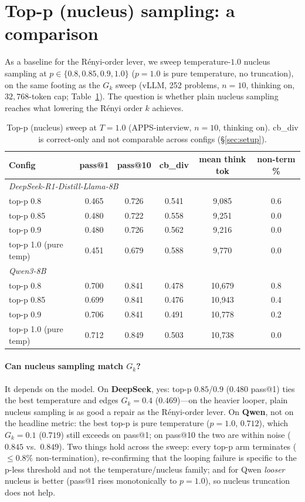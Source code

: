 \documentclass[11pt]{article}                       %
\begin{document}
\section{Top-p (nucleus) sampling: a comparison}\label{app:topp}
As a baseline for the R\'enyi-order lever, we sweep temperature-$1.0$ nucleus sampling at
$p\in\{0.8,0.85,0.9,1.0\}$ ($p{=}1.0$ is pure temperature, no truncation), on the same footing as the
$G_k$ sweep (vLLM, 252 problems, $n{=}10$, thinking on, $32{,}768$-token cap; Table~\ref{tab:topp}). The
question is whether plain nucleus sampling reaches what lowering the R\'enyi order $k$ achieves.

\begin{table}[H]\centering\small
\caption{Top-p (nucleus) sweep at $T{=}1.0$ (APPS-interview, $n{=}10$, thinking on). cb\_div is
correct-only and not comparable across configs (\S\ref{sec:setup}).}
\label{tab:topp}
\begin{tabular}{lccccc}
\toprule
Config & pass@1 & pass@10 & cb\_div & mean think tok & non-term \% \\
\midrule
\multicolumn{6}{l}{\textit{DeepSeek-R1-Distill-Llama-8B}}\\
top-p 0.8             & 0.465 & 0.726 & 0.541 & 9{,}085 & 0.6 \\
top-p 0.85            & 0.480 & 0.722 & 0.558 & 9{,}251 & 0.0 \\
top-p 0.9             & 0.480 & 0.726 & 0.562 & 9{,}216 & 0.0 \\
top-p 1.0 (pure temp) & 0.451 & 0.679 & 0.588 & 9{,}770 & 0.0 \\
\midrule
\multicolumn{6}{l}{\textit{Qwen3-8B}}\\
top-p 0.8             & 0.700 & 0.841 & 0.478 & 10{,}679 & 0.8 \\
top-p 0.85            & 0.699 & 0.841 & 0.476 & 10{,}943 & 0.4 \\
top-p 0.9             & 0.706 & 0.841 & 0.491 & 10{,}778 & 0.2 \\
top-p 1.0 (pure temp) & 0.712 & 0.849 & 0.503 & 10{,}738 & 0.0 \\
\bottomrule
\end{tabular}
\end{table}

\paragraph{Can nucleus sampling match $G_k$?} It depends on the model. On \textbf{DeepSeek}, yes:
top-p $0.85$/$0.9$ ($0.480$ pass@1) ties the best temperature and edges $G_k{=}0.4$ ($0.469$)---on the
heavier looper, plain nucleus sampling is as good a repair as the R\'enyi-order lever. On
\textbf{Qwen}, not on the headline metric: the best top-p is pure temperature ($p{=}1.0$, $0.712$),
which $G_k{=}0.1$ ($0.719$) still exceeds on pass@1; on pass@10 the two are within noise ($0.845$ vs.\
$0.849$). Two things hold across the sweep: every top-p arm terminates ($\le0.8\%$ non-termination),
re-confirming that the looping failure is specific to the p-less threshold and not the
temperature/nucleus family; and for Qwen \emph{looser} nucleus is better (pass@1 rises monotonically to
$p{=}1.0$), so nucleus truncation does not help.
\end{document}

